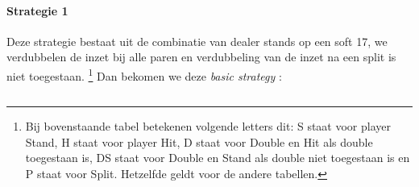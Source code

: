 \documentclass[conference]{IEEEtran}
\begin{document}
\paragraph{Strategie 1}

Deze strategie bestaat uit de combinatie van dealer stands op een soft 17, we verdubbelen de inzet bij alle paren en verdubbeling van de inzet na een split is niet toegestaan. \footnote{ Bij bovenstaande tabel betekenen volgende letters dit: S staat voor player Stand, H staat voor player Hit, D staat voor Double en Hit als double toegestaan is, DS staat voor Double en Stand als double niet toegestaan is en P staat voor Split. Hetzelfde geldt voor de andere tabellen.}
Dan bekomen we deze \textit{basic strategy} :

\begin{table}[ht]
\tiny
\centering
\begin{tabular}{|l|l|l|l|l|l|l|l|l|l|l|}
\hline


\end{tabular}
\end{table}
\end{document}
